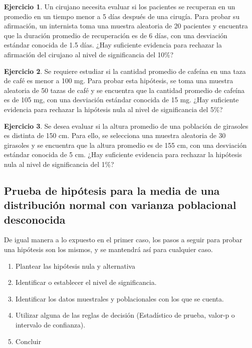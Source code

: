 \documentclass[
  11pt,
]{book}
\providecommand{\tightlist}{%
  \setlength{\itemsep}{0pt}\setlength{\parskip}{0pt}}
\theoremstyle{definition}
\theoremstyle{definition}
\theoremstyle{definition}
\newtheorem{exercise}{Ejercicio}[chapter]
\theoremstyle{definition}
\theoremstyle{remark}
\begin{document}
\begin{exercise}
Un cirujano necesita evaluar si los pacientes se recuperan en un promedio en un tiempo menor a 5 días después de una cirugía. Para probar su afirmación, un internista toma una muestra aleatoria de 20 pacientes y encuentra que la duración promedio de recuperación es de 6 días, con una desviación estándar conocida de 1.5 días. ¿Hay suficiente evidencia para rechazar la afirmación del cirujano al nivel de significancia del 10\%?
\end{exercise}

\begin{exercise}
Se requiere estudiar si la cantidad promedio de cafeína en una taza de café es menor a 100 mg. Para probar esta hipótesis, se toma una muestra aleatoria de 50 tazas de café y se encuentra que la cantidad promedio de cafeína es de 105 mg, con una desviación estándar conocida de 15 mg. ¿Hay suficiente evidencia para rechazar la hipótesis nula al nivel de significancia del 5\%?
\end{exercise}

\begin{exercise}
Se desea evaluar si la altura promedio de una población de girasoles es distinta de 150 cm. Para ello, se selecciona una muestra aleatoria de 30 girasoles y se encuentra que la altura promedio es de 155 cm, con una desviación estándar conocida de 5 cm. ¿Hay suficiente evidencia para rechazar la hipótesis nula al nivel de significancia del 1\%?
\end{exercise}

\subsection{Prueba de hipótesis para la media de una distribución normal con varianza poblacional desconocida}\label{prueba-de-hipuxf3tesis-para-la-media-de-una-distribuciuxf3n-normal-con-varianza-poblacional-desconocida}

De igual manera a lo expuesto en el primer caso, los pasos a seguir para probar una hipótesis son los mismos, y se mantendrá así para cualquier caso.

\begin{enumerate}
\def\labelenumi{\arabic{enumi}.}
\tightlist
\item
  Plantear las hipótesis nula y alternativa
\item
  Identificar o establecer el nivel de significancia.
\item
  Identificar los datos muestrales y poblacionales con los que se cuenta.
\item
  Utilizar alguna de las reglas de decisión (Estadístico de prueba, valor-p o intervalo de confianza).
\item
  Concluir
\end{enumerate}
\end{document}
